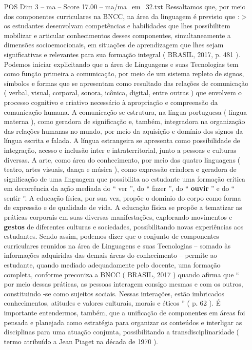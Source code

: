 \begin{textsample}{POS Dim 3 – ma – Score 17.00 – ma/ma\_em\_32.txt}
Ressaltamos que, por meio dos componentes curriculares na BNCC, na área da linguagem é previsto que : > os estudantes desenvolvam competências e habilidades que lhes possibilitem mobilizar e articular conhecimentos desses componentes, simultaneamente a dimensões socioemocionais, em situações de aprendizagem que lhes sejam significativas e relevantes para sua formação integral ( BRASIL, 2017, p. 481 ).
Podemos iniciar explicitando que a área de Linguagens e suas Tecnologias tem como função primeira a comunicação, por meio de um sistema repleto de signos, símbolos e formas que se apresentam como resultado das relações de comunicação ( verbal, visual, corporal, sonora, icônica, digital, entre outras ) que envolvem o processo cognitivo e criativo necessário à apropriação e compreensão da comunicação humana.
A comunicação se estrutura, na língua portuguesa ( língua materna ), como geradora de significação e, também, integradora na organização das relações humanas no mundo, por meio da aquisição e domínio dos signos da língua escrita e falada.
A língua estrangeira se apresenta como possibilidade de integração, acesso e inclusão inter e intraterritorial, junto a pessoas e culturas diversas.
A arte, como área do conhecimento, por meio das quatro linguagens ( teatro, artes visuais, dança e música ), como expressão criadora e geradora de significação de uma linguagem que possibilita ao estudante uma formação crítica em decorrência da ação mediada do “ ver ”, do “ fazer ”, do “ \textbf{ouvir} ” e do “ sentir ”.
A educação física, por sua vez, propõe o domínio do corpo como forma de expressão e de qualidade de vida.
A educação física se propõe a tematizar as práticas corporais em suas diversas manifestações, explorando movimentos e \textbf{gestos} de diferentes culturas e sociedades, possibilitando novas experiências aos estudantes.
Sendo assim, podemos dizer que o conjunto de componentes curriculares reunidos na área de Linguagens e suas Tecnologias – somado às informações adquiridas das demais áreas do conhecimento – permite ao estudante, quando mediado adequadamente pelo docente, uma formação completa, conforme preconiza a BNCC ( BRASIL, 2017 ) quando afirma que “ por meio dessas práticas, as pessoas interagem consigo mesmas e com os outros, constituindo -se como sujeitos sociais.
Nessas interações, estão imbricados conhecimentos, atitudes e valores culturais, morais e éticos ” ( p. 62 ).
É importante entendermos, também, que a unificação de componentes em áreas foi pensada e planejada como estratégia para organizar os conteúdos e interligar as disciplinas para uma atuação conjunta, possibilitando a transdisciplinaridade ( termo atribuído a Jean Piaget na década de 1970 ).

\end{textsample}
